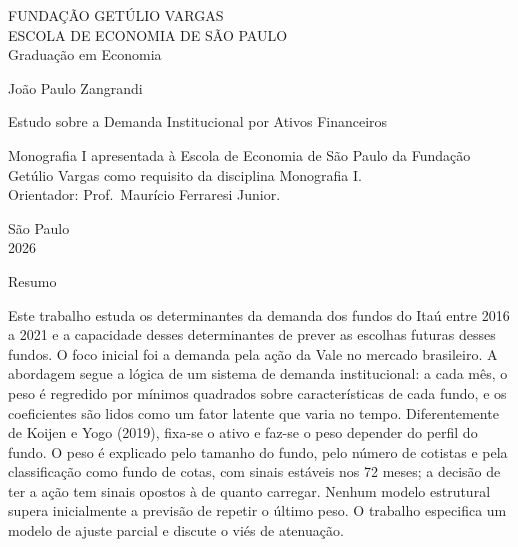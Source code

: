 \documentclass[12pt,a4paper]{article}
\begin{document}
\thispagestyle{empty}
\begin{center}
{\large FUNDAÇÃO GETÚLIO VARGAS}\\[2pt]
{\large ESCOLA DE ECONOMIA DE SÃO PAULO}\\[16pt]
{\normalsize Graduação em Economia}

\vspace{3.5cm}

{\large João Paulo Zangrandi}

\vspace{3.0cm}

{\Large Estudo sobre a Demanda Institucional por Ativos Financeiros}

\vspace{3.0cm}

\begin{flushright}
\begin{minipage}{0.62\textwidth}
\small{}
Monografia I apresentada à Escola de Economia de São Paulo da Fundação Getúlio
Vargas como requisito da disciplina Monografia I.
\\[10pt]
Orientador: Prof.\ Maurício Ferraresi Junior.
\end{minipage}
\end{flushright}

\vfill

{\normalsize São Paulo}\\
{\normalsize 2026}
\end{center}

\newpage

\thispagestyle{fancy}
\begin{center}{\large Resumo}\end{center}
\noindent
Este trabalho estuda os determinantes da demanda dos fundos do Itaú entre 2016 a 2021 e a
capacidade desses determinantes de prever as escolhas futuras desses fundos. O foco inicial
foi a demanda pela ação da Vale no mercado brasileiro. A abordagem segue a lógica de um
sistema de demanda institucional: a cada mês, o peso é regredido por mínimos quadrados sobre
características de cada fundo, e os coeficientes são lidos como um fator latente que varia no
tempo. Diferentemente de Koijen e Yogo (2019), fixa-se o ativo e faz-se o peso depender do
perfil do fundo. O peso é explicado pelo tamanho do fundo, pelo número de cotistas e pela
classificação como fundo de cotas, com sinais estáveis nos 72 meses; a decisão de ter a ação
tem sinais opostos à de quanto carregar. Nenhum modelo estrutural supera inicialmente a
previsão de repetir o último peso. O trabalho especifica um modelo de ajuste parcial e discute
o viés de atenuação.
\end{document}
